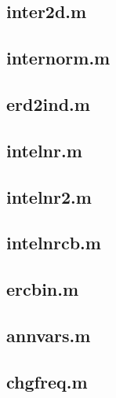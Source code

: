 \subsection{inter2d.m}
\label{sec:app18}



\subsection{internorm.m}
\label{sec:app19}


\subsection{erd2ind.m}
\label{sec:app20}



\subsection{intelnr.m}
\label{sec:app21}


\subsection{intelnr2.m}
\label{sec:app22}


\subsection{intelnrcb.m}
\label{sec:app23}


\subsection{ercbin.m}
\label{sec:app24}


\subsection{annvars.m}
\label{sec:app25}


\subsection{chgfreq.m}
\label{sec:app26}


